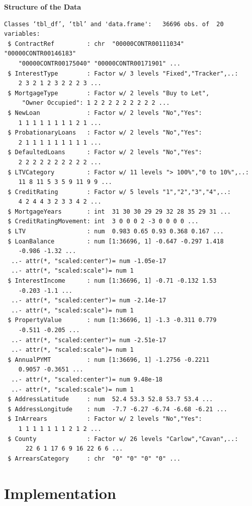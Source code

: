 \textbf{Structure of the Data}
\begin{verbatim}
Classes ‘tbl_df’, ‘tbl’ and 'data.frame':	36696 obs. of  20 variables:
 $ ContractRef         : chr  "00000CONTR00111034" "00000CONTR00146183"
    "00000CONTR00175040" "00000CONTR00171901" ...
 $ InterestType        : Factor w/ 3 levels "Fixed","Tracker",..:
    2 3 2 1 2 3 2 2 2 3 ...
 $ MortgageType        : Factor w/ 2 levels "Buy to Let",
     "Owner Occupied": 1 2 2 2 2 2 2 2 2 2 ...
 $ NewLoan             : Factor w/ 2 levels "No","Yes":
    1 1 1 1 1 1 1 1 2 1 ...
 $ ProbationaryLoans   : Factor w/ 2 levels "No","Yes": 
    2 1 1 1 1 1 1 1 1 1 ...
 $ DefaultedLoans      : Factor w/ 2 levels "No","Yes":
    2 2 2 2 2 2 2 2 2 2 ...
 $ LTVCategory         : Factor w/ 11 levels "> 100%","0 to 10%",..:
    11 8 11 5 3 5 9 11 9 9 ...
 $ CreditRating        : Factor w/ 5 levels "1","2","3","4",..:
    4 2 4 4 3 2 3 3 4 2 ...
 $ MortgageYears       : int  31 30 30 29 29 32 28 35 29 31 ...
 $ CreditRatingMovement: int  3 0 0 0 2 -3 0 0 0 0 ...
 $ LTV                 : num  0.983 0.65 0.93 0.368 0.167 ...
 $ LoanBalance         : num [1:36696, 1] -0.647 -0.297 1.418
    -0.986 -1.32 ...
  ..- attr(*, "scaled:center")= num -1.05e-17
  ..- attr(*, "scaled:scale")= num 1
 $ InterestIncome      : num [1:36696, 1] -0.71 -0.132 1.53 
    -0.203 -1.1 ...
  ..- attr(*, "scaled:center")= num -2.14e-17
  ..- attr(*, "scaled:scale")= num 1
 $ PropertyValue       : num [1:36696, 1] -1.3 -0.311 0.779
    -0.511 -0.205 ...
  ..- attr(*, "scaled:center")= num -2.51e-17
  ..- attr(*, "scaled:scale")= num 1
 $ AnnualPYMT          : num [1:36696, 1] -1.2756 -0.2211 
    0.9057 -0.3651 ...
  ..- attr(*, "scaled:center")= num 9.48e-18
  ..- attr(*, "scaled:scale")= num 1
 $ AddressLatitude     : num  52.4 53.3 52.8 53.7 53.4 ...
 $ AddressLongitude    : num  -7.7 -6.27 -6.74 -6.68 -6.21 ...
 $ InArrears           : Factor w/ 2 levels "No","Yes":
    1 1 1 1 1 1 1 2 1 2 ...
 $ County              : Factor w/ 26 levels "Carlow","Cavan",..: 
      22 6 1 17 6 9 16 22 6 6 ...
 $ ArrearsCategory     : chr  "0" "0" "0" "0" ...
\end{verbatim}

\section{Implementation}\label{}

